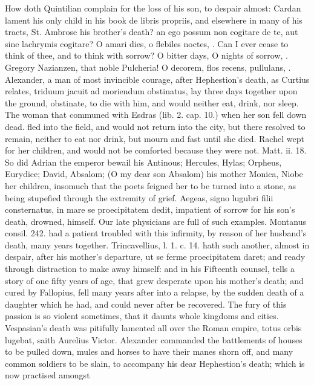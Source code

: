 {{How doth Quintilian complain for the loss of his son, to despair
almost: Cardan lament his only child in his book de libris propriis,
and elsewhere in many of his tracts, St. Ambrose his brother's
death? an ego possum non cogitare de te, aut sine lachrymis cogitare? O
amari dies, o flebiles noctes, \etc{}. Can I ever cease to think of thee,
and to think with sorrow? O bitter days, O nights of sorrow, \etc{}.
Gregory Nazianzen, that noble Pulcheria! O decorem, \etc{} flos recens,
pullulans, \etc{}. Alexander, a man of most invincible courage, after
Hephestion's death, as Curtius relates, triduum jacuit ad moriendum
obstinatus, lay three days together upon the ground, obstinate, to die
with him, and would neither eat, drink, nor sleep. The woman that
communed with Esdras (lib. 2. cap. 10.) when her son fell down dead.
fled into the field, and would not return into the city, but there
resolved to remain, neither to eat nor drink, but mourn and fast until
she died. Rachel wept for her children, and would not be comforted
because they were not. Matt. ii. 18. So did Adrian the emperor bewail
his Antinous; Hercules, Hylas; Orpheus, Eurydice; David, Absalom; (O my
dear son Absalom) \Austin{} his mother Monica, Niobe her children,
insomuch that the poets feigned her to be turned into a stone, as
being stupefied through the extremity of grief. Aegeas, signo
lugubri filii consternatus, in mare se proecipitatem dedit, impatient
of sorrow for his son's death, drowned, himself. Our late physicians
are full of such examples. Montanus consil. 242. had a patient
troubled with this infirmity, by reason of her husband's death, many
years together. Trincavellius, l. 1. c. 14. hath such another, almost
in despair, after his mother's departure, ut se ferme
proecipitatem daret; and ready through distraction to make away
himself: and in his Fifteenth counsel, tells a story of one fifty years
of age, that grew desperate upon his mother's death; and cured by
Fallopius, fell many years after into a relapse, by the sudden death of
a daughter which he had, and could never after be recovered. The fury
of this passion is so violent sometimes, that it daunts whole kingdoms
and cities. Vespasian's death was pitifully lamented all over the Roman
empire, totus orbis lugebat, saith Aurelius Victor. Alexander commanded
the battlements of houses to be pulled down, mules and horses to have
their manes shorn off, and many common soldiers to be slain, to
accompany his dear Hephestion's death; which is now practised amongst
}}
